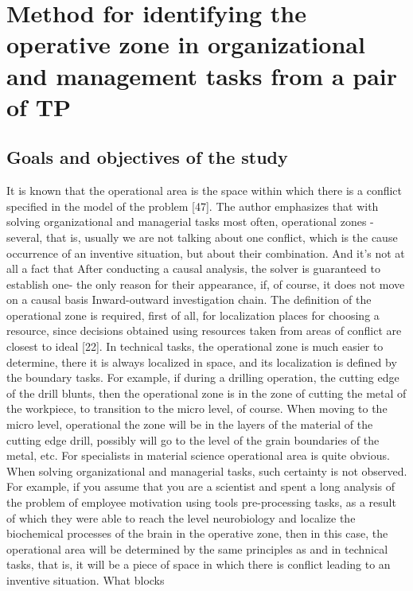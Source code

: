 \chapter{Method for identifying the operative zone in organizational and
  management tasks from a pair of TP} 

\section{Goals and objectives of the study}

It is known that the operational area is the space within which
there is a conflict specified in the model of the problem [47]. The author emphasizes that with
solving organizational and managerial tasks most often, operational zones -
several, that is, usually we are not talking about one conflict, which is the cause
occurrence of an inventive situation, but about their combination. And it’s not at all a fact that
After conducting a causal analysis, the solver is guaranteed to establish one-
the only reason for their appearance, if, of course, it does not move on a causal basis
Inward-outward investigation chain.
The definition of the operational zone is required, first of all, for localization
places for choosing a resource, since decisions obtained using resources taken from
areas of conflict are closest to ideal [22].
In technical tasks, the operational zone is much easier to determine, there
it is always localized in space, and its localization is defined by the boundary
tasks. For example, if during a drilling operation, the cutting edge of the drill
blunts, then the operational zone is in the zone of cutting the metal of the workpiece, to
transition to the micro level, of course. When moving to the micro level, operational
the zone will be in the layers of the material of the cutting edge drill, possibly
will go to the level of the grain boundaries of the metal, etc. For specialists in
material science operational area is quite obvious.
When solving organizational and managerial tasks, such certainty is not
observed. For example, if you assume that you are a scientist and spent a long
analysis of the problem of employee motivation using tools
pre-processing tasks, as a result of which they were able to reach the level
neurobiology and localize the biochemical processes of the brain in the operative zone, then
in this case, the operational area will be determined by the same principles as
and in technical tasks, that is, it will be a piece of space in which there is
conflict leading to an inventive situation. What blocks
